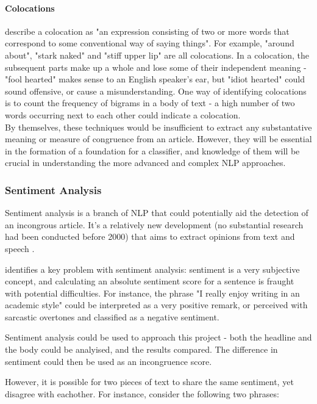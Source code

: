 \paragraph{Colocations}
\citeauthor{manning1999} describe a colocation as "an expression consisting of two or more words that correspond to some conventional way of saying things". For example, "around about", "stark naked" and "stiff upper lip" are all colocations. In a colocation, the subsequent parts make up a whole and lose some of their independent meaning - "fool hearted" makes sense to an English speaker's ear, but "idiot hearted" could sound offensive, or cause a misunderstanding.
	One way of identifying colocations is to count the frequency of bigrams in a body of text - a high number of two words occurring next to each other could indicate a colocation. \\

By themselves, these techniques would be insufficient to extract any substantative meaning or measure of congruence from an article. However, they will be essential in the formation of a foundation for a classifier, and knowledge of them will be crucial in understanding the more advanced and complex NLP approaches.

\subsubsection{Sentiment Analysis}\label{lit:sentiment-analysis}
Sentiment analysis is a branch of NLP that could potentially aid the detection of an incongrous article. It's a relatively new development (no substantial research had been conducted before 2000) that aims to extract opinions from text and speech \cite{liu2012}.

 identifies a key problem with sentiment analysis: sentiment is a very subjective concept, and calculating an absolute sentiment score for a sentence is fraught with potential difficulties. For instance, the phrase "I really enjoy writing in an academic style" could be interpreted as a very positive remark, or perceived with sarcastic overtones and classified as a negative sentiment.

Sentiment analysis could be used to approach this project - both the headline and the body could be analyised, and the results compared. The difference in sentiment could then be used as an incongruence score.

However, it is possible for two pieces of text to share the same sentiment, yet disagree with eachother. For instance, consider the following two phrases:

